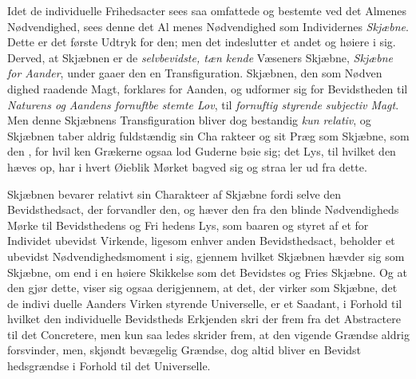 Idet de individuelle Frihedsacter sees saa omfattede og
bestemte ved det Almenes Nødvendighed, sees denne det Al\-%
menes Nødvendighed som Individernes \emph{Skjæbne}. Dette er
det første Udtryk for den; men det indeslutter et andet og
høiere i sig. Derved, at Skjæbnen er de \emph{selvbevidste, tæn\-%
kende} Væseners Skjæbne, \emph{Skjæbne for Aander}, under\-%
gaaer den en Transfiguration. Skjæbnen, den som Nødven\-%
dighed raadende Magt, forklares for Aanden, og udformer sig
for Bevidstheden til \emph{Naturens og Aandens fornuftbe\-%
stemte Lov}, til \emph{fornuftig styrende subjectiv Magt}.
Men denne Skjæbnens Transfiguration bliver dog bestandig
\emph{kun relativ}, og Skjæbnen taber aldrig fuldstændig sin Cha\-%
rakteer og sit Præg som Skjæbne, som den , for hvil\-%
ken Grækerne ogsaa lod Guderne bøie sig; det Lys, til hvilket
den hæves op, har i hvert Øieblik Mørket bagved sig og straa\-%
ler ud fra dette.

Skjæbnen bevarer relativt sin Charakteer af Skjæbne fordi
selve den Bevidsthedsact, der forvandler den, og hæver den
fra den blinde Nødvendigheds Mørke til Bevidsthedens og Fri\-%
hedens Lys, som baaren og styret af et for Individet ubevidst
Virkende, ligesom enhver anden Bevidsthedsact, beholder et
ubevidst Nødvendighedsmoment i sig, gjennem hvilket Skjæbnen
hævder sig som Skjæbne, om end i en høiere Skikkelse som det
Bevidstes og Fries Skjæbne. Og at den gjør dette, viser sig ogsaa
 derigjennem, at det, der virker som Skjæbne, det de indivi\-%
duelle Aanders Virken styrende Universelle, er et Saadant, i
Forhold til hvilket den individuelle Bevidstheds Erkjenden skri\-%
der frem fra det Abstractere til det Concretere, men kun saa\-%
ledes skrider frem, at den vigende Grændse aldrig forsvinder,
men, skjøndt bevægelig Grændse, dog altid bliver en Bevidst\-%
hedsgrændse i Forhold til det Universelle.

